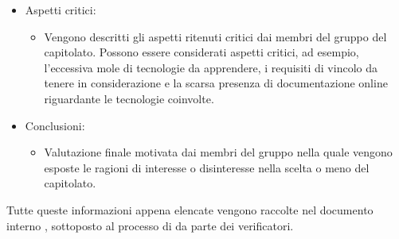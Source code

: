 \begin{itemize}
\item Aspetti critici:
	\begin{itemize}
	\item Vengono descritti gli aspetti ritenuti critici dai membri del gruppo \Gruppo{} del capitolato.
	Possono essere considerati aspetti critici, ad esempio, l'eccessiva mole di tecnologie da apprendere, i requisiti di vincolo da tenere in considerazione e la scarsa presenza di documentazione online riguardante le tecnologie coinvolte.
	\end{itemize}
\item Conclusioni:
	\begin{itemize}
	\item Valutazione finale motivata dai membri del gruppo \Gruppo{} nella quale vengono esposte le ragioni di interesse o disinteresse nella scelta o meno del capitolato.
	\end{itemize}
\end{itemize}
Tutte queste informazioni appena elencate vengono raccolte nel documento interno \glo{\SdF{}}, sottoposto al processo di  da parte dei verificatori.